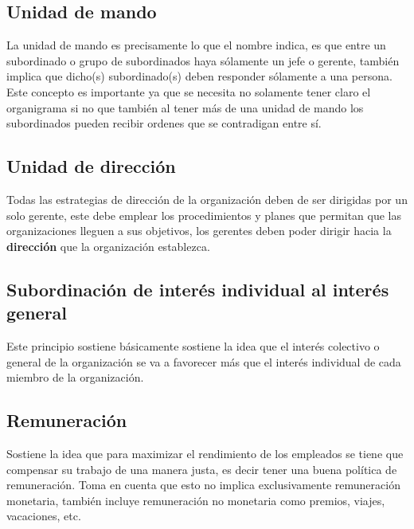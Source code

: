 \documentclass{article}
\begin{document}
\subsection{Unidad de mando}
La unidad de mando es precisamente lo que el nombre indica, es que entre un subordinado o grupo de subordinados haya sólamente un jefe o gerente, también implica que dicho(s) subordinado(s) deben responder sólamente a una persona. Este concepto es importante ya que se necesita no solamente tener claro el organigrama si no que también al tener más de una unidad de mando los subordinados pueden recibir ordenes que se contradigan entre sí.


\subsection{Unidad de dirección}
Todas las estrategias de dirección de la organización deben de ser dirigidas por un solo gerente, este debe emplear los procedimientos y planes que permitan que las organizaciones lleguen a sus objetivos, los gerentes deben poder dirigir hacia la \textbf{dirección} que la organización establezca.


\subsection{Subordinación de interés individual al interés general}
Este principio sostiene básicamente sostiene la idea que el interés colectivo o general de la organización se va a favorecer más que el interés individual de cada miembro de la organización.


\subsection{Remuneración}
Sostiene la idea que para maximizar el rendimiento de los empleados se tiene que compensar su trabajo de una manera justa, es decir tener una buena política de remuneración.
Toma en cuenta que esto no implica exclusivamente remuneración monetaria, también incluye remuneración no monetaria como premios, viajes, vacaciones, etc. 


\end{document}
